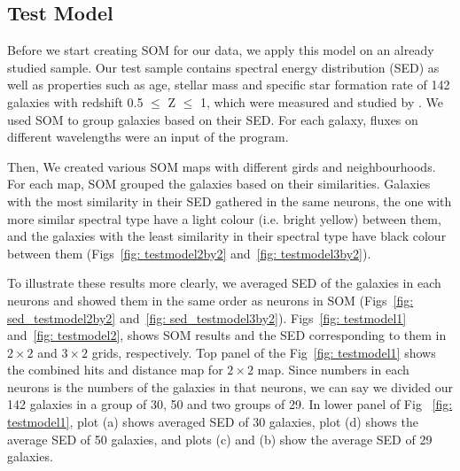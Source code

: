  \subsection{Test Model}
 \label{sec: test model}
    Before we start creating SOM for our data, we apply this model on an already studied sample. 
    Our test sample contains spectral energy distribution (SED) as well as properties such as age, stellar mass and specific star formation rate of 142 galaxies with redshift 0.5 $ \leq$ Z $\leq $ 1, which were measured and studied by \cite{Hossein12}. 
    We used SOM to group galaxies based on their SED. For each galaxy, fluxes on different wavelengths were an input of the program. %
    
    Then, We created various SOM maps with different girds and neighbourhoods. 
    For each map, SOM grouped the galaxies based on their similarities. 
    Galaxies with the most similarity in their SED gathered in the same neurons, the one with more similar spectral type have a light colour (i.e. bright yellow) between them, and the galaxies with the least similarity in their spectral type have black colour between them (Figs~\ref{fig: testmodel2by2} and~\ref{fig: testmodel3by2}).
    
    To illustrate these results more clearly, we averaged SED of the galaxies in each neurons and showed them in the same order as neurons in SOM (Figs~\ref{fig: sed_testmodel2by2} and~\ref{fig: sed_testmodel3by2}). 
    Figs~\ref{fig: testmodel1} and~\ref{fig: testmodel2}, shows SOM results and the SED corresponding to them in $2\times2$ and $3\times2$ grids, respectively.  
    Top panel of the Fig~\ref{fig: testmodel1} shows the combined hits and distance map for  $2\times2$ map. Since numbers in each neurons is the numbers of the galaxies in that neurons, we can say we divided our 142 galaxies in a group of 30, 50 and two groups of 29. In lower panel of Fig ~\ref{fig: testmodel1}, plot (a) shows averaged SED of 30 galaxies, plot (d) shows the average SED of 50 galaxies, and plots (c) and (b) show the average SED of 29 galaxies. 
    

